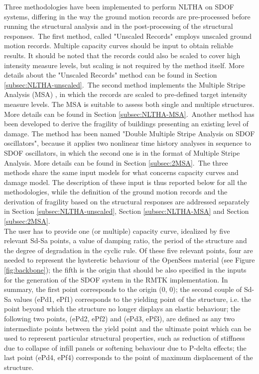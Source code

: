 Three methodologies have been implemented to perform NLTHA on SDOF systems, differing in the way the ground motion records are pre-processed before running the structural analysis and in the post-processing of the structural responses.\
The first method, called "Unscaled Records" employs unscaled ground motion records. Multiple capacity curves should be input to obtain reliable results. It should be noted that the records could also be scaled to cover high intensity measure levels, but scaling is not required by the method itself. More details about the "Unscaled Records" method can be found in Section \ref{subsec:NLTHA-unscaled}.\
The second method implements the Multiple Stripe Analysis (MSA) \citep{Jalayer2003}, in which the records are scaled to pre-defined target intensity measure levels. The MSA is suitable to assess both single and multiple structures. More details can be found in Section \ref{subsec:NLTHA-MSA}.\
Another method has been developed to derive the fragility of buildings presenting an existing level of damage. The method has been named "Double Multiple Stripe Analysis on SDOF oscillators", because it applies two nonlinear time history analyses in sequence to SDOF oscillators, in which the second one is in the format of Multiple Stripe Analysis. More details can be found in Section \ref{subsec:2MSA}.\
The three methods share the same input models for what concerns capacity curves and damage model. The description of these input is thus reported below for all the methodologies, while the definition of the ground motion records and the derivation of fragility based on the structural responses are addressed separately in Section \ref{subsec:NLTHA-unscaled}, Section \ref{subsec:NLTHA-MSA} and Section \ref{subsec:2MSA}.\\

The user has to provide one (or multiple) capacity curve, idealized by five relevant Sd-Sa points, a value of damping ratio, the period of the structure and the degree of degradation in the cyclic rule. Of these five relevant points, four are needed to represent the hysteretic behaviour of the OpenSees material (see Figure \ref{fig:backbone}); the fifth is the origin that should be also specified in the inputs for the generation of the SDOF system in the RMTK implementation. In summary, the first point corresponds to the origin (0, 0); the second couple of Sd-Sa values (ePd1, ePf1) corresponds to the yielding point of the structure, i.e. the point beyond which the structure no longer displays an elastic behaviour; the following two points, (ePd2, ePf2) and (ePd3, ePf3), are defined as any two intermediate points between the yield point and the ultimate point which can be used to represent particular structural properties, such as reduction of stiffness due to collapse of infill panels or softening behaviour due to P-delta effects; the last point (ePd4, ePf4) corresponds to the point of maximum displacement of the structure.

